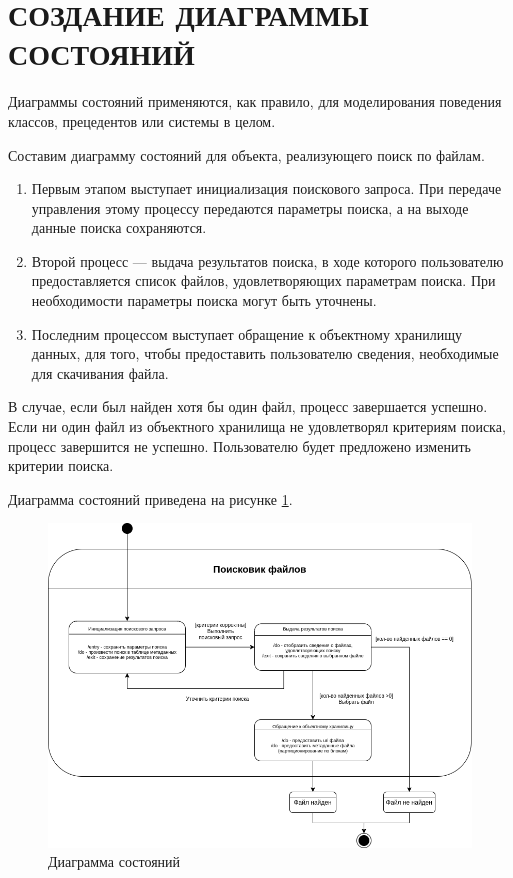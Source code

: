 \documentclass[a4paper,14pt]{extarticle}
\begin{document}
\newpage
\section{СОЗДАНИЕ ДИАГРАММЫ СОСТОЯНИЙ}

Диаграммы состояний применяются, как правило, для моделирования
поведения классов, прецедентов или системы в целом.

Составим диаграмму состояний для объекта, реализующего поиск по файлам. 

\begin{enumerate}
	\item Первым этапом выступает инициализация поискового запроса. При передаче управления этому процессу передаются параметры поиска, а на выходе данные поиска сохраняются. 
	\item Второй процесс --- выдача результатов поиска, в ходе которого пользователю предоставляется список файлов, удовлетворяющих параметрам поиска. При необходимости параметры поиска могут быть уточнены. 
	\item Последним процессом выступает обращение к объектному хранилищу данных, для того, чтобы предоставить пользователю сведения, необходимые для скачивания файла. 
\end{enumerate}

В случае, если был найден хотя бы один файл, процесс завершается успешно. Если ни один файл из объектного хранилища не удовлетворял критериям поиска, процесс завершится не успешно. Пользователю будет предложено изменить критерии поиска. 

Диаграмма состояний приведена на рисунке \ref{fig:statechart}.

\begin{figure}[h!]
	\centering
	\includegraphics[width=0.6\linewidth]{images/statechart}
	\caption{Диаграмма состояний}
	\label{fig:statechart}
\end{figure}
\end{document}
